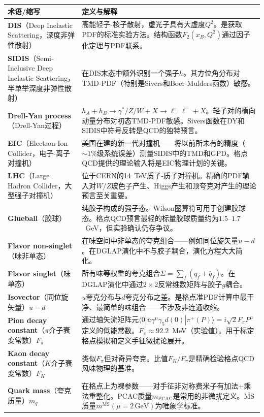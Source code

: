 \documentclass[12pt,a4paper]{ctexart}
\begin{document}
\begin{longtable}{p{3.5cm}p{9cm}}
\toprule
\textbf{术语/缩写} & \textbf{定义与解释} \\
\midrule
\endhead
\textbf{DIS}（Deep Inelastic Scattering，深度非弹性散射）& 高能轻子-核子散射，虚光子具有大虚度$Q^2$。是获取PDF的标准实验方法。结构函数$F_2(x_B,Q^2)$通过因子化定理与PDF联系。\\
\textbf{SIDIS}（Semi-Inclusive Deep Inelastic Scattering，半单举深度非弹性散射）& 在DIS末态中额外识别一个强子$h$。其方位角分布对TMD-PDF（特别是Sivers和Boer-Mulders函数）敏感。\\
\textbf{Drell-Yan process}（Drell-Yan过程）& $h_A + h_B \to \gamma^*/Z/W + X \to \ell^+\ell^- + X$。轻子对的横向动量分布对初态TMD-PDF敏感。Sivers函数在DY和SIDIS中符号反转是QCD的独特预言。\\
\textbf{EIC}（Electron-Ion Collider，电子-离子对撞机）& 美国在建的新一代对撞机——将以前所未有的精度（$\sim 1\%$级系统误差）测量SIDIS中的TMD和GPD。格点QCD提供的理论输入将是EIC物理计划的关键。\\
\textbf{LHC}（Large Hadron Collider，大型强子对撞机）& 位于CERN的14~TeV质子-质子对撞机。精确的PDF输入对$W/Z$玻色子产生、Higgs产生和顶夸克对产生的理论预言至关重要。\\
\textbf{Glueball}（胶球）& 纯胶子构成的强子态。Wilson圈算符可用于创建胶球态。格点QCD预言最轻的标量胶球质量约为$1.5\text{--}1.7$~GeV，但实验确认仍存争议。\\
\textbf{Flavor non-singlet}（味非单态）& 在味空间中非单态的夸克组合——例如同位旋矢量$u-d$。在DGLAP演化中不与胶子耦合，演化方程大大简化。\\
\textbf{Flavor singlet}（味单态）& 所有味等权重的夸克组合$\Sigma = \sum_f(q_f + \bar q_f)$。在DGLAP演化中通过$2\times2$反常维数矩阵与胶子$g$耦合。\\
\textbf{Isovector}（同位旋矢量）$u-d$& $u$夸克分布与$d$夸克分布之差。是格点准PDF计算中最干净、最简单的味组合——不涉及非连通收缩。\\
\textbf{Pion decay constant}（$\pi$介子衰变常数）$F_\pi$& 通过轴矢流矩阵元$\langle 0|\bar u\gamma^\mu\gamma_5 d(0)|\pi^+(P)\rangle = i\sqrt{2}F_\pi P^\mu$定义的低能常数。$F_\pi \approx 92.2$~MeV（实验值）。用于标定格点模拟和定义手征微扰论展开。\\
\textbf{Kaon decay constant}（$K$介子衰变常数）$F_K$& 类似$F_\pi$但对奇异夸克。比值$F_K/F_\pi$是精确检验格点QCD风味物理的基准。\\
\textbf{Quark mass}（夸克质量）$m_q$& 在格点上为裸参数——对手征非对称费米子有加法+乘法重整化。PCAC质量$m_{\text{PCAC}}$是常用的非微扰定义。$\overline{\text{MS}}$质量$m^{\overline{\text{MS}}}(\mu=2\,\text{GeV})$为唯象学标准。\\
\bottomrule
\end{longtable}
\end{document}

